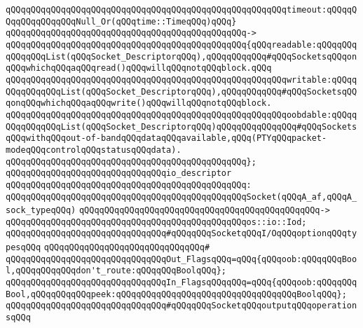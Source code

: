 \verb|qQQqqQQqqQQqqQQqqQQqqQQqqQQqqQQqqQQqqQQqqQQqqQQqqQQqqQQqtimeout:qQQqqQQqqQQqqQQqqQQqNull_Or(qQQqtime::TimeqQQq)qQQq}|\newline
\verb|qQQqqQQqqQQqqQQqqQQqqQQqqQQqqQQqqQQqqQQqqQQqqQQq->|\newline
\verb|qQQqqQQqqQQqqQQqqQQqqQQqqQQqqQQqqQQqqQQqqQQqqQQq{qQQqreadable:qQQqqQQqqQQqqQQqList(qQQqSocket_DescriptorqQQq),qQQqqQQqqQQq#qQQqSocketsqQQqonqQQqwhichqQQqaqQQqread()qQQqwillqQQqnotqQQqblock.qQQq|\newline
\verb|qQQqqQQqqQQqqQQqqQQqqQQqqQQqqQQqqQQqqQQqqQQqqQQqqQQqqQQqwritable:qQQqqQQqqQQqqQQqList(qQQqSocket_DescriptorqQQq),qQQqqQQqqQQq#qQQqSocketsqQQqonqQQqwhichqQQqaqQQqwrite()qQQqwillqQQqnotqQQqblock.|\newline
\verb|qQQqqQQqqQQqqQQqqQQqqQQqqQQqqQQqqQQqqQQqqQQqqQQqqQQqqQQqoobdable:qQQqqQQqqQQqqQQqList(qQQqSocket_DescriptorqQQq)qQQqqQQqqQQqqQQq#qQQqSocketsqQQqwithqQQqout-of-bandqQQqdataqQQqavailable,qQQq(PTYqQQqpacket-modeqQQqcontrolqQQqstatusqQQqdata).|\newline
\verb|qQQqqQQqqQQqqQQqqQQqqQQqqQQqqQQqqQQqqQQqqQQqqQQq};|\newline
\newline
\verb|qQQqqQQqqQQqqQQqqQQqqQQqqQQqqQQqio_descriptor|\newline
\verb|qQQqqQQqqQQqqQQqqQQqqQQqqQQqqQQqqQQqqQQqqQQqqQQq:|\newline
\verb|qQQqqQQqqQQqqQQqqQQqqQQqqQQqqQQqqQQqqQQqqQQqqQQqSocket(qQQqA_af,qQQqA_sock_typeqQQq)|\newline
\verb|qQQqqQQqqQQqqQQqqQQqqQQqqQQqqQQqqQQqqQQqqQQqqQQq->|\newline
\verb|qQQqqQQqqQQqqQQqqQQqqQQqqQQqqQQqqQQqqQQqqQQqqQQqos::io::Iod;|\newline
\newline
\verb|qQQqqQQqqQQqqQQqqQQqqQQqqQQqqQQq#qQQqqQQqSocketqQQqI/OqQQqoptionqQQqtypesqQQq|\newline
\verb|qQQqqQQqqQQqqQQqqQQqqQQqqQQqqQQq#|\newline
\verb|qQQqqQQqqQQqqQQqqQQqqQQqqQQqqQQqOut_FlagsqQQq=qQQq{qQQqoob:qQQqqQQqBool,qQQqqQQqqQQqdon't_route:qQQqqQQqBoolqQQq};|\newline
\verb|qQQqqQQqqQQqqQQqqQQqqQQqqQQqqQQqIn_FlagsqQQqqQQq=qQQq{qQQqoob:qQQqqQQqBool,qQQqqQQqqQQqpeek:qQQqqQQqqQQqqQQqqQQqqQQqqQQqqQQqqQQqBoolqQQq};|\newline
\newline
\verb|qQQqqQQqqQQqqQQqqQQqqQQqqQQqqQQq#qQQqqQQqSocketqQQqoutputqQQqoperationsqQQq|\newline
